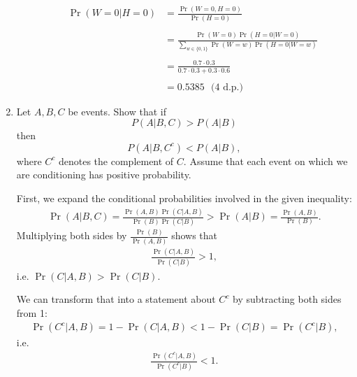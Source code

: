 \documentclass{article}
\begin{document}
\begin{enumerate}[label=(\alph*)]
\begin{enumerate}[label=(\roman*)]
\begin{mdframed}
            \begin{align*}
              \Pr(W=0|H=0)
              &= \frac{\Pr(W=0, H=0)}{\Pr(H=0)} \\\\
              &= \frac{\Pr(W=0) \Pr(H=0|W=0)}{\sum_{w \in \{0, 1\}} \Pr(W=w) \Pr(H=0|W=w)} \\\\
              &= \frac{0.7 \cdot 0.3}{0.7 \cdot 0.3 + 0.3 \cdot 0.6} \\\\
              &= 0.5385 ~~~\text{(4 d.p.)}
            \end{align*}
          \end{mdframed}
    \end{enumerate}

  \item Let $A, B, C$ be events. Show that if $$P(A|B, C) > P(A|B)$$
    then $$P(A|B, C^c) < P(A|B),$$ where $C^c$ denotes the complement of
    $C$. Assume that each event on which we are conditioning has positive
    probability.



    \begin{mdframed}

      First, we expand the conditional probabilities involved in the given inequality:
      \begin{align*}
        \Pr(A|B,C) = \frac{\Pr(A,B)\Pr(C|A,B)}{\Pr(B)\Pr(C|B)} > \Pr(A|B) = \frac{\Pr(A,B)}{\Pr(B)}.
      \end{align*}
      Multiplying both sides by $\frac{\Pr(B)}{\Pr(A,B)}$ shows that
      \begin{align*}
        \frac{\Pr(C|A,B)}{\Pr(C|B)} > 1,
      \end{align*}
      i.e. $\Pr(C|A,B) > \Pr(C|B)$.

      We can transform that into a statement about $C^c$ by subtracting both sides from 1:
      \begin{align*}
        \Pr(C^c|A,B) = 1 - \Pr(C|A,B) < 1 - \Pr(C|B) = \Pr(C^c|B),
      \end{align*}
      i.e.
      \begin{align*}
        \frac{\Pr(C^c|A,B)}{\Pr(C^c|B)} < 1.
      \end{align*}


\end{mdframed}
\end{enumerate}
\end{document}
